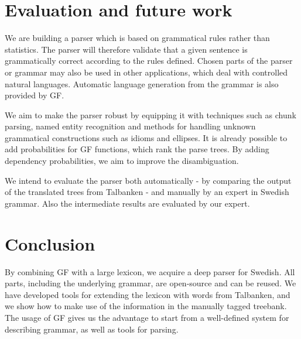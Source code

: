 \documentclass[submission]{eptcs} %
\begin{document}
\section{Evaluation and future work}
We are building a parser which is based on grammatical rules rather than
statistics. The parser will therefore validate that
a given sentence is grammatically correct according to the rules defined.
Chosen parts of the parser or grammar may also be used in other applications,
which deal with controlled natural languages. Automatic language
generation from the grammar is also provided by GF.

We aim to make the parser robust by equipping it with techniques such as chunk
parsing, named entity recognition and methods for handling unknown 
grammatical constructions such as idioms and ellipses. %
It is already possible to add probabilities for GF functions,
which rank the parse trees.
By adding dependency probabilities, we aim to improve the
disambiguation.

We intend to evaluate the parser both automatically - by comparing the output of
the translated trees from Talbanken - and manually by an expert in Swedish grammar.
Also the intermediate results are evaluated by our expert.


\section{Conclusion}
By combining GF with a large lexicon, we acquire a deep parser for 
Swedish. All parts, including the underlying grammar, are open-source and can be reused.
We have developed tools for extending the lexicon with words from Talbanken,
and we show how to make use of the information in the manually tagged
treebank.
The usage of GF gives us the advantage to start from
a well-defined system for describing grammar, as well as tools for
parsing.

\end{document}
